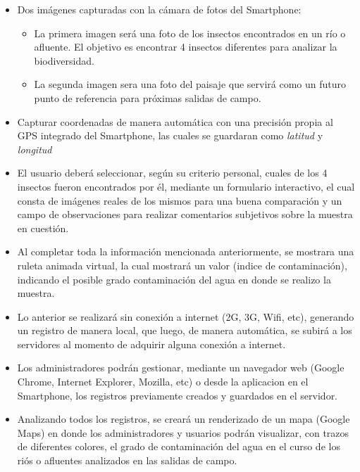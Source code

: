       \begin{itemize}
        \item Dos imágenes capturadas con la cámara de fotos del Smartphone:
        
        \begin{itemize}
          \item La primera imagen será una foto de los insectos encontrados en un río o afluente. El objetivo es encontrar 4 insectos diferentes para analizar la biodiversidad.
         
          \item La segunda imagen sera una foto del paisaje que servirá como un futuro punto de referencia para próximas salidas de campo. 
        \end{itemize}
        
        \item Capturar coordenadas de manera automática con una precisión propia al GPS integrado del Smartphone, las cuales se guardaran como \emph{latitud} y \emph{longitud}
        
        \item El usuario deberá seleccionar, según su criterio personal, cuales de los 4 insectos fueron encontrados por él, mediante un formulario interactivo, el cual consta de imágenes reales de los mismos para una buena comparación y un campo de observaciones para realizar comentarios subjetivos sobre la muestra en cuestión.
        
        \item Al completar toda la información mencionada anteriormente, se mostrara una ruleta animada virtual, la cual mostrará un valor (indice de contaminación), indicando el posible grado contaminación del agua en donde se realizo la muestra.

        \item Lo anterior se realizará sin conexión a internet (2G, 3G, Wifi, etc), generando un registro de manera local, que luego, de manera automática, se subirá a los servidores al momento de adquirir alguna conexión a internet.

        \item Los administradores podrán gestionar, mediante un navegador web (Google Chrome, Internet Explorer, Mozilla, etc) o desde la aplicacion en el Smartphone, los registros previamente creados y guardados en el servidor.

        \item Analizando todos los registros, se creará un renderizado de un mapa  (Google Maps) en donde los administradores y usuarios podrán visualizar, con trazos de diferentes colores, el grado de contaminación del agua en el curso de los riós o afluentes analizados en las salidas de campo.
      \end{itemize}

